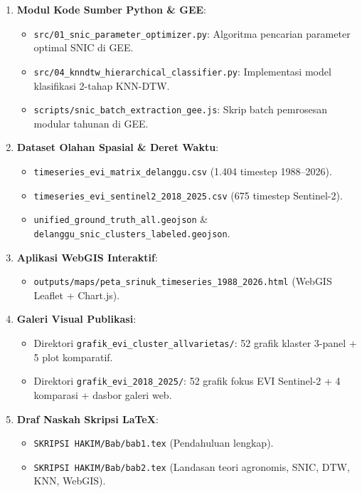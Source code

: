 \documentclass[11pt,a4paper]{article}
\begin{document}
\begin{enumerate}
    \item \textbf{Modul Kode Sumber Python \& GEE}:
    \begin{itemize}
        \item \texttt{src/01\_snic\_parameter\_optimizer.py}: Algoritma pencarian parameter optimal SNIC di GEE.
        \item \texttt{src/04\_knndtw\_hierarchical\_classifier.py}: Implementasi model klasifikasi 2-tahap KNN-DTW.
        \item \texttt{scripts/snic\_batch\_extraction\_gee.js}: Skrip batch pemrosesan modular tahunan di GEE.
    \end{itemize}
    \item \textbf{Dataset Olahan Spasial \& Deret Waktu}:
    \begin{itemize}
        \item \texttt{timeseries\_evi\_matrix\_delanggu.csv} (1.404 timestep 1988--2026).
        \item \texttt{timeseries\_evi\_sentinel2\_2018\_2025.csv} (675 timestep Sentinel-2).
        \item \texttt{unified\_ground\_truth\_all.geojson} \& \texttt{delanggu\_snic\_clusters\_labeled.geojson}.
    \end{itemize}
    \item \textbf{Aplikasi WebGIS Interaktif}:
    \begin{itemize}
        \item \texttt{outputs/maps/peta\_srinuk\_timeseries\_1988\_2026.html} (WebGIS Leaflet + Chart.js).
    \end{itemize}
    \item \textbf{Galeri Visual Publikasi}:
    \begin{itemize}
        \item Direktori \texttt{grafik\_evi\_cluster\_allvarietas/}: 52 grafik klaster 3-panel + 5 plot komparatif.
        \item Direktori \texttt{grafik\_evi\_2018\_2025/}: 52 grafik fokus EVI Sentinel-2 + 4 komparasi + dasbor galeri web.
    \end{itemize}
    \item \textbf{Draf Naskah Skripsi LaTeX}:
    \begin{itemize}
        \item \texttt{SKRIPSI HAKIM/Bab/bab1.tex} (Pendahuluan lengkap).
        \item \texttt{SKRIPSI HAKIM/Bab/bab2.tex} (Landasan teori agronomis, SNIC, DTW, KNN, WebGIS).
    \end{itemize}
\end{enumerate}
\end{document}

